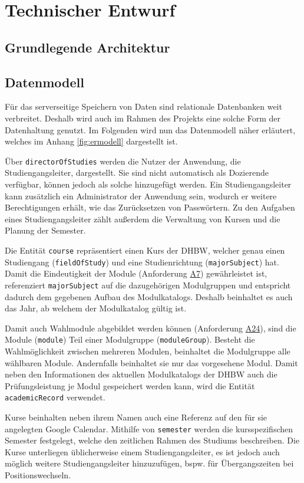\section{Technischer Entwurf}
\subsection{Grundlegende Architektur}

\subsection{Datenmodell}
Für das serverseitige Speichern von Daten sind relationale Datenbanken weit verbreitet.
Deshalb wird auch im Rahmen des Projekts eine solche Form der Datenhaltung genutzt.
Im Folgenden wird nun das Datenmodell näher erläutert, welches im Anhang \ref{fig:ermodell} dargestellt ist.  

Über \texttt{directorOfStudies} werden die Nutzer der Anwendung, die Studiengangsleiter, dargestellt.
Sie sind nicht automatisch als Dozierende verfügbar, können jedoch als solche hinzugefügt werden.
Ein Studiengangsleiter kann zusätzlich ein Administrator der Anwendung sein, wodurch er weitere Berechtigungen erhält, wie das Zurücksetzen von Passwörtern.
Zu den Aufgaben eines Studiengangsleiter zählt außerdem die Verwaltung von Kursen und die Planung der Semester. 

Die Entität \texttt{course} repräsentiert einen Kurs der \ac{DHBW}, welcher genau einen Studiengang (\texttt{fieldOfStudy}) und eine Studienrichtung (\texttt{majorSubject}) hat.
Damit die Eindeutigkeit der Module (Anforderung \hyperref[tab:Anforderungen]{A7}) gewährleistet ist, referenziert \texttt{majorSubject} auf die dazugehörigen Modulgruppen und entspricht dadurch dem gegebenen Aufbau des Modulkatalogs.
Deshalb beinhaltet es auch das Jahr, ab welchem der Modulkatalog gültig ist. 

Damit auch Wahlmodule abgebildet werden können (Anforderung \hyperref[tab:Anforderungen]{A24}), sind die Module (\texttt{module}) Teil einer Modulgruppe (\texttt{moduleGroup}).
Besteht die Wahlmöglichkeit zwischen mehreren Modulen, beinhaltet die Modulgruppe alle wählbaren Module.
Andernfalls beinhaltet sie nur das vorgesehene Modul.
Damit neben den Informationen des aktuellen Modulkatalogs der \ac{DHBW} auch die Prüfungsleistung je Modul gespeichert werden kann, wird die Entität \texttt{academicRecord} verwendet.

Kurse beinhalten neben ihrem Namen auch eine Referenz auf den für sie angelegten Google Calendar. 
Mithilfe von \texttt{semester} werden die kursspezifischen Semester festgelegt, welche den zeitlichen Rahmen des Studiums beschreiben.
Die Kurse unterliegen üblicherweise einem Studiengangsleiter, es ist jedoch auch möglich weitere Studiengangsleiter hinzuzufügen, bspw. für Übergangszeiten bei Positionswechseln.

